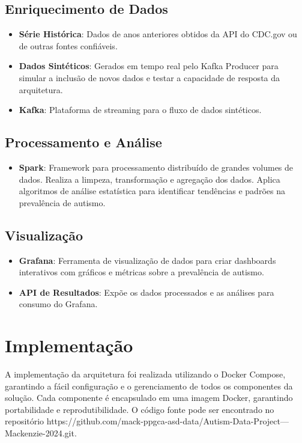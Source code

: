 \documentclass[12pt]{article}
\begin{document}
\subsection{Enriquecimento de Dados}
\begin{itemize}
    \item \textbf{Série Histórica}: Dados de anos anteriores obtidos da API do CDC.gov ou de outras fontes confiáveis.
    \item \textbf{Dados Sintéticos}: Gerados em tempo real pelo Kafka Producer para simular a inclusão de novos dados e testar a capacidade de resposta da arquitetura.
    \item \textbf{Kafka}: Plataforma de streaming para o fluxo de dados sintéticos.
\end{itemize}

\subsection{Processamento e Análise}
\begin{itemize}
    \item \textbf{Spark}: Framework para processamento distribuído de grandes volumes de dados. Realiza a limpeza, transformação e agregação dos dados. Aplica algoritmos de análise estatística para identificar tendências e padrões na prevalência de autismo.
\end{itemize}

\subsection{Visualização}
\begin{itemize}
    \item \textbf{Grafana}: Ferramenta de visualização de dados para criar dashboards interativos com gráficos e métricas sobre a prevalência de autismo.
    \item \textbf{API de Resultados}: Expõe os dados processados e as análises para consumo do Grafana.
\end{itemize}


\section{Implementação}

A implementação da arquitetura foi realizada utilizando o Docker Compose, garantindo a fácil configuração e o gerenciamento de todos os componentes da solução. Cada componente é encapsulado em uma imagem Docker, garantindo portabilidade e reprodutibilidade. O código fonte pode ser encontrado no repositório https://github.com/mack-ppgca-asd-data/Autism-Data-Project---Mackenzie-2024.git.
\end{document}
